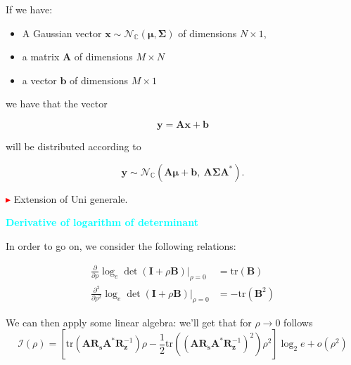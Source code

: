 \documentclass[a4paper, 11pt]{book}
\begin{document}
\begin{tcolorbox}[colframe=violet!80!white, colback=white, boxrule=1pt, arc=2pt]
\begin{tcolorbox}[frame empty, sharp corners, boxrule=0pt, leftrule=2pt, colframe=green!60!black, colback=white, left=5pt, top=0pt, bottom=0pt]
        If we have:
        \begin{itemize}[label=\textcolor{gray}{\textbullet}, leftmargin=*]
            \item A Gaussian vector $\bm{x} \sim \mathcal{N}_{\mathbb{C}}(\bm{\mu}, \bm{\Sigma})$ of dimensions $N \times 1$,
            \item a matrix $\bm{A}$ of dimensions $M \times N$
            \item a vector $\bm{b}$ of dimensions $M \times 1$
        \end{itemize}
        
        we have that the vector
        
        $$
        \bm{y} = \bm{A}\bm{x} + \bm{b}
        $$
        
        will be distributed according to
        
        $$
        \bm{y} \sim \mathcal{N}_{\mathbb{C}}(\bm{A}\bm{\mu} + \bm{b}, \ \bm{A}\bm{\Sigma}\bm{A}^*)\text{.}
        $$
        
        \vspace{0.5em}
        \textcolor{red}{\small $\blacktriangleright$} Extension of \textcolor{green!60!black}{Uni generale}.
    \end{tcolorbox}
\end{tcolorbox}

\vspace{1em}

\begin{tcolorbox}[colframe=cyan, colback=white, boxrule=1pt, arc=2pt]
    \textcolor{cyan}{\textbf{\small {} Derivative of logarithm of determinant}} %

    In order to go on, we consider the following relations:
    
    \begin{align*}
        \frac{\partial}{\partial \rho} \log_e \det(\bm{I} + \rho\bm{B}) \bigg|_{\rho=0} &= \text{tr}(\bm{B}) \\
        \frac{\partial^2}{\partial \rho^2} \log_e \det(\bm{I} + \rho\bm{B}) \bigg|_{\rho=0} &= -\text{tr}(\bm{B}^2)
    \end{align*}
\end{tcolorbox}

We can then apply some linear algebra: we'll get that for $\rho \to 0$ follows
$$
\mathcal{I}(\rho) = \left[ \text{tr}(\bm{A}\bm{R}_{\bm{s}}\bm{A}^*\bm{R}_{\bm{z}}^{-1})\rho - \frac{1}{2} \text{tr}((\bm{A}\bm{R}_{\bm{s}}\bm{A}^*\bm{R}_{\bm{z}}^{-1})^2)\rho^2 \right] \log_2 e + o(\rho^2)
$$
\end{document}
